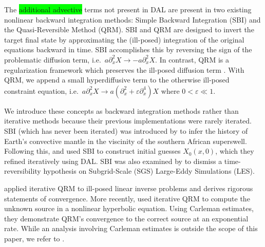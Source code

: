 \documentclass[%
 reprint,
 amsmath,amssymb,
 aps,
 pre,
]{revtex4-2}
\begin{document}
The \colorbox{lime}{additional advective} terms not present in DAL are present in two existing nonlinear backward integration methods: Simple Backward Integration (SBI) and the Quasi-Reversible Method (QRM). 
SBI and QRM are designed to invert the target final state by approximating the (ill-posed) integration of the original equations backward in time.
SBI accomplishes this by reversing the sign of the problematic diffusion term, i.e.~$a\partial_x^2 X \to -a\partial^2_x X$.
In contrast, QRM is a regularization framework which preserves the ill-posed diffusion term \cite{qrmsource}.
With QRM, we append a small hyperdiffusive term to the otherwise ill-posed constraint equation, i.e.~$a\partial_x^2 X \to a(\partial^2_x + \varepsilon\partial^4_x) X$ where $0<\varepsilon\ll 1$. 

We introduce these concepts as backward integration methods rather than iterative methods because their previous implementations were rarely iterated.
SBI (which has never been iterated) was introduced by \cite{Conrad2003} to infer the history of Earth's convective mantle in the viscinity of the southern African superswell.
Following this, \cite{Liu2008} and \cite{Li2017} used SBI to construct initial guesses $X_0(x,0)$, which they refined iteratively using DAL.
SBI was also examined by \cite{Fang2012} to dismiss a time-reversibility hypothesis on Subgrid-Scale (SGS) Large-Eddy Simulations (LES). 

\cite{darde2016} applied iterative QRM to ill-posed linear inverse problems and derives rigorous statements of convergence.
More recently, \cite{Nguyen2022} used iterative QRM to compute the unknown source in a nonlinear hyperbolic equation.
Using Carleman estimates, they demonstrate QRM's convergence to the correct source at an exponential rate.
While an analysis involving Carleman estimates is outside the scope of this paper, we refer to \cite{imanuvilov_2022}.


\end{document}

